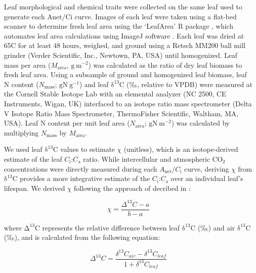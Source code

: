     Leaf morphological and chemical traits were collected on the same leaf used to generate each Anet/Ci curve. Images of each leaf were taken using a flat-bed scanner to determine fresh leaf area using the ‘LeafArea’ R package , which automates leaf area calculations using ImageJ software . Each leaf was dried at 65\textdegree{}C for at least 48 hours, weighed, and ground using a Retsch MM200 ball mill grinder (Verder Scientific, Inc., Newtown, PA, USA) until homogenized. Leaf mass per area ($M\mathrm{_{area}}$, $\mathrm{g\ m^{-2}}$) was calculated as the ratio of dry leaf biomass to fresh leaf area. Using a subsample of ground and homogenized leaf biomass, leaf N content ($N\mathrm{_{mass}}$; $\mathrm{gN\ g^{-1}}$) and leaf $\mathrm{\delta^{13}C}$ (‰, relative to VPDB) were measured at the Cornell Stable Isotope Lab with an elemental analyzer (NC 2500, CE Instruments, Wigan, UK) interfaced to an isotope ratio mass spectrometer (Delta V Isotope Ratio Mass Spectrometer, ThermoFisher Scientific, Waltham, MA, USA). Leaf N content per unit leaf area ($N\mathrm{_{area}}$; $\mathrm{gN\ m^{-2}}$) was calculated by multiplying $N\mathrm{_{mass}}$ by $M\mathrm{_{area}}$.

    We used leaf $\mathrm{\delta^{13}C}$ values to estimate $\chi$ (unitless), which is an isotope-derived estimate of the leaf $C_\mathrm{i}$:$C_\mathrm{a}$ ratio. While intercellular and atmospheric $\mathrm{CO_2}$ concentrations were directly measured during each $A_\mathrm{{net}}/C_\mathrm{i}$ curve, deriving $\chi$ from $\mathrm{\delta^{13}C}$ provides a more integrative estimate of the $C_\mathrm{i}$:$C_\mathrm{a}$ over an individual leaf’s lifespan. We derived $\chi$ following the approach of  decribed in :

    \begin{equation} \label{eq_2.1}
        \chi= \frac{\Delta^{13}C-a}{b-a}
    \end{equation}

    \noindent where $\mathrm{\Delta^{13}C}$ represents the relative difference between leaf $\mathrm{\delta^{13}C}$ (‰) and air $\mathrm{\delta^{13}C}$ (‰), and is calculated from the following equation:

    \begin{equation} \label{eq_2.2}
        \Delta^{13}C= \frac{\delta^{13}C_{air}-\delta^{13}C_{leaf}}{1+\delta^{13}C_{leaf}}
    \end{equation}
    
